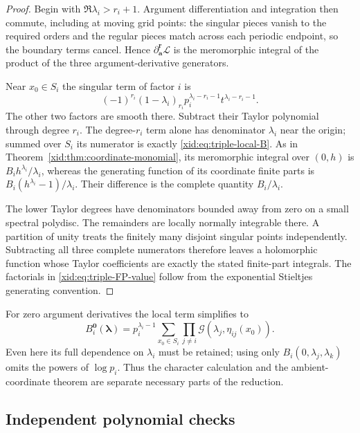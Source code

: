 \documentclass[11pt,a4paper]{article}
\numberwithin{equation}{section}
\theoremstyle{definition}
\theoremstyle{remark}
\begin{document}
\begin{proof}
Begin with $\Re\lambda_i>r_i+1$. Argument differentiation and
integration then commute, including at moving grid points: the singular
pieces vanish to the required orders and the regular pieces match across
each periodic endpoint, so the boundary terms cancel. Hence
$\partial_{\boldsymbol a}^{\boldsymbol r}\mathcal L$ is the
meromorphic integral of the product of the three argument-derivative
generators.

Near $x_0\in S_i$ the singular term of factor $i$ is
\[
 (-1)^{r_i}(1-\lambda_i)_{r_i}
 p_i^{\lambda_i-r_i-1}t^{\lambda_i-r_i-1}.
\]
The other two factors are smooth there.  Subtract their Taylor
polynomial through degree $r_i$.  The degree-$r_i$ term alone has
denominator $\lambda_i$ near the origin; summed over $S_i$ its
numerator is exactly \eqref{xid:eq:triple-local-B}.
As in Theorem~\ref{xid:thm:coordinate-monomial}, its meromorphic integral
over $(0,h)$ is $B_i h^{\lambda_i}/\lambda_i$, whereas the generating
function of its coordinate finite parts is
$B_i(h^{\lambda_i}-1)/\lambda_i$.  Their difference is the complete
quantity $B_i/\lambda_i$.

The lower Taylor degrees have denominators bounded away from zero
on a small spectral polydisc.  The remainders are locally normally
integrable there.  A partition of unity treats the finitely many
disjoint singular points independently.  Subtracting all three
complete numerators therefore leaves a holomorphic function whose
Taylor coefficients are exactly the stated finite-part integrals.
The factorials in \eqref{xid:eq:triple-FP-value} follow from the exponential
Stieltjes generating convention.
\end{proof}

For zero argument derivatives the local term simplifies to
\[
 B_i^{\boldsymbol0}(\boldsymbol\lambda)
 =p_i^{\lambda_i-1}\sum_{x_0\in S_i}
             \prod_{j\ne i}\mathscr G(\lambda_j,\eta_{ij}(x_0)).
\]
Even here its full dependence on $\lambda_i$ must be retained; using
only $B_i(0,\lambda_j,\lambda_k)$ omits the powers of $\log p_i$.
Thus the character calculation and the ambient-coordinate theorem are
separate necessary parts of the reduction.

\subsection{Independent polynomial checks}
\end{document}
